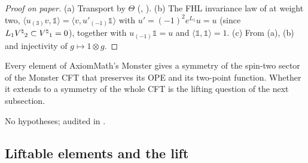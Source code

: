 \begin{proof}[Proof on paper]
(a) Transport by $\Theta$ (, ).  (b) The FHL invariance law of
 at weight two, $\langle u_{(3)}v,\mathbb1\rangle=\langle v,u'_{(-1)}\mathbb1\rangle$ with
$u'=(-1)^2e^{L_1}u=u$ (since $L_1{V^{\natural}}_2\subset{V^{\natural}}_1=0$), together with $u_{(-1)}\mathbb1=u$ and
$\langle\mathbb1,\mathbb1\rangle=1$.  (c) From (a), (b) and injectivity of $g\mapsto1\otimes g$.
\end{proof}
\begin{physics}
Every element of AxiomMath's Monster gives a symmetry of the spin-two sector of the Monster CFT that
preserves its OPE and its two-point function.  Whether it extends to a symmetry of the whole CFT is the
lifting question of the next subsection.
\end{physics}
\begin{status}
No hypotheses; audited in .
\end{status}

\subsection{Liftable elements and the lift}


